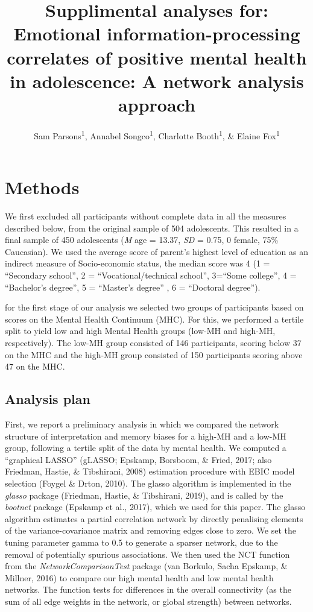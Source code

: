 \documentclass[
  english,
  man,floatsintext]{apa6}
\author{Sam Parsons\textsuperscript{1}, Annabel Songco\textsuperscript{1}, Charlotte Booth\textsuperscript{1}, \& Elaine Fox\textsuperscript{1}}
\affiliation{
\vspace{0.5cm}
\textsuperscript{1} Department of Experimental Psychology, University of Oxford}
\title{Supplimental analyses for:
Emotional information-processing correlates of positive mental health in adolescence: A network analysis approach}
\date{}
\begin{document}
\maketitle

\hypertarget{methods}{%
\section{Methods}\label{methods}}

We first excluded all participants without complete data in all the measures described below, from the original sample of 504 adolescents. This resulted in a final sample of 450 adolescents (\emph{M} age = 13.37, \emph{SD} = 0.75, 0 female, 75\% Caucasian). We used the average score of parent's highest level of education as an indirect measure of Socio-economic status, the median score was 4 (1 = \enquote{Secondary school}, 2 = \enquote{Vocational/technical school}, 3=\enquote{Some college}, 4 = \enquote{Bachelor's degree}, 5 = \enquote{Master's degree} , 6 = \enquote{Doctoral degree}).

for the first stage of our analysis we selected two groups of participants based on scores on the Mental Health Continuum (MHC). For this, we performed a tertile split to yield low and high Mental Health groups (low-MH and high-MH, respectively). The low-MH group consisted of 146 participants, scoring below 37 on the MHC and the high-MH group consisted of 150 participants scoring above 47 on the MHC.

\hypertarget{analysis-plan}{%
\subsection{Analysis plan}\label{analysis-plan}}

First, we report a preliminary analysis in which we compared the network structure of interpretation and memory biases for a high-MH and a low-MH group, following a tertile split of the data by mental health. We computed a \enquote{graphical LASSO} (gLASSO; Epskamp, Borsboom, \& Fried, 2017; also Friedman, Hastie, \& Tibshirani, 2008) estimation procedure with EBIC model selection (Foygel \& Drton, 2010). The glasso algorithm is implemented in the \emph{glasso} package (Friedman, Hastie, \& Tibshirani, 2019), and is called by the \emph{bootnet} package (Epskamp et al., 2017), which we used for this paper. The glasso algorithm estimates a partial correlation network by directly penalising elements of the variance-covariance matrix and removing edges close to zero. We set the tuning parameter gamma to 0.5 to generate a sparser network, due to the removal of potentially spurious associations. We then used the NCT function from the \emph{NetworkComparisonTest} package (van Borkulo, Sacha Epskamp, \& Millner, 2016) to compare our high mental health and low mental health networks. The function tests for differences in the overall connectivity (as the sum of all edge weights in the network, or global strength) between networks.
\end{document}
